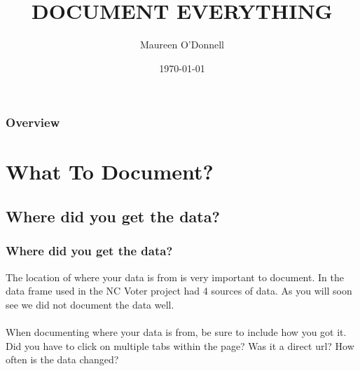 \documentclass{beamer}\usepackage[]{graphicx}\usepackage[]{color}
\title[The Importance of Documenting Where Your Data is From]{DOCUMENT EVERYTHING} %
\author{Maureen O'Donnell} %
\institute[4870] %
{
Dr. Arnholt Senior Seminar\\ %
\medskip
\textit{odonnellm@appstate.edu} %
}
\date{\today} %
\begin{document}
\begin{frame}
\titlepage %
\end{frame}

\begin{frame}
\frametitle{Overview} %
\tableofcontents %
\end{frame}


\section{What To Document?} %

\subsection{Where did you get the data?} %

\begin{frame}
\frametitle{Where did you get the data?}
The location of where your data is from is very important to document.  In the data frame used in the NC Voter project had 4 sources of data. As you will soon see we did not document the data well.\\~\\

When documenting where your data is from, be sure to include how you got it.  Did you have to click on multiple tabs within the page? Was it a direct url? How often is the data changed?
\end{frame}
\end{document}
